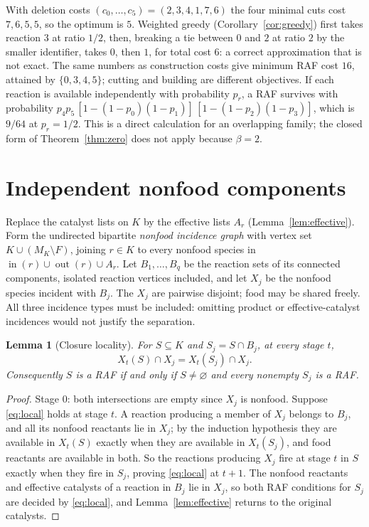 \documentclass[11pt,a4paper]{article}
\theoremstyle{plain}
\newtheorem{lemma}[theorem]{Lemma}
\theoremstyle{definition}
\theoremstyle{remark}
\newcommand{\inp}{\operatorname{in}}
\newcommand{\out}{\operatorname{out}}
\begin{document}
With deletion costs $(c_0,\ldots,c_5)=(2,3,4,1,7,6)$ the four minimal cuts cost $7,6,5,5$, so the optimum is $5$. Weighted greedy (Corollary~\ref{cor:greedy}) first takes reaction $3$ at ratio $1/2$, then, breaking a tie between $0$ and $2$ at ratio $2$ by the smaller identifier, takes $0$, then $1$, for total cost $6$: a correct approximation that is not exact. The same numbers as construction costs give minimum RAF cost $16$, attained by $\{0,3,4,5\}$; cutting and building are different objectives. If each reaction is available independently with probability $p_r$, a RAF survives with probability $p_4p_5\,[1-(1-p_0)(1-p_1)]\,[1-(1-p_2)(1-p_3)]$, which is $9/64$ at $p_r=1/2$. This is a direct calculation for an overlapping family; the closed form of Theorem~\ref{thm:zero} does not apply because $\beta=2$.

\section{Independent nonfood components}\label{sec:components}

Replace the catalyst lists on $K$ by the effective lists $A_r$ (Lemma~\ref{lem:effective}). Form the undirected bipartite \emph{nonfood incidence graph} with vertex set $K\cup(M_K\setminus F)$, joining $r\in K$ to every nonfood species in $\inp(r)\cup\out(r)\cup A_r$. Let $B_1,\ldots,B_q$ be the reaction sets of its connected components, isolated reaction vertices included, and let $X_j$ be the nonfood species incident with $B_j$. The $X_j$ are pairwise disjoint; food may be shared freely. All three incidence types must be included: omitting product or effective-catalyst incidences would not justify the separation.

\begin{lemma}[Closure locality]\label{lem:local}
For $S\subseteq K$ and $S_j=S\cap B_j$, at every stage $t$,
\begin{equation}\label{eq:local}
 X_t(S)\cap X_j=X_t(S_j)\cap X_j .
\end{equation}
Consequently $S$ is a RAF if and only if $S\neq\varnothing$ and every nonempty $S_j$ is a RAF.
\end{lemma}
\begin{proof}
Stage $0$: both intersections are empty since $X_j$ is nonfood. Suppose \eqref{eq:local} holds at stage $t$. A reaction producing a member of $X_j$ belongs to $B_j$, and all its nonfood reactants lie in $X_j$; by the induction hypothesis they are available in $X_t(S)$ exactly when they are available in $X_t(S_j)$, and food reactants are available in both. So the reactions producing $X_j$ fire at stage $t$ in $S$ exactly when they fire in $S_j$, proving \eqref{eq:local} at $t+1$. The nonfood reactants and effective catalysts of a reaction in $B_j$ lie in $X_j$, so both RAF conditions for $S_j$ are decided by \eqref{eq:local}, and Lemma~\ref{lem:effective} returns to the original catalysts.
\end{proof}
\end{document}

